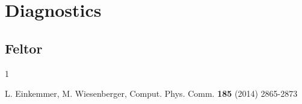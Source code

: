\documentclass{hitec} %
\renewenvironment{thebibliography}[1]{
  \begin{oldthebibliography}{#1}
    \RaggedRight %
    \setlength{\itemsep}{0em}
    \setlength{\parskip}{0em}
}
{
  \end{oldthebibliography}
}
\begin{document}
\section{Diagnostics}
\subsection{Feltor}
\begin{thebibliography}{1}
      L. Einkemmer, M. Wiesenberger, Comput. Phys. Comm. {\bf 185} (2014) 2865-2873
\end{thebibliography}
\end{document}
